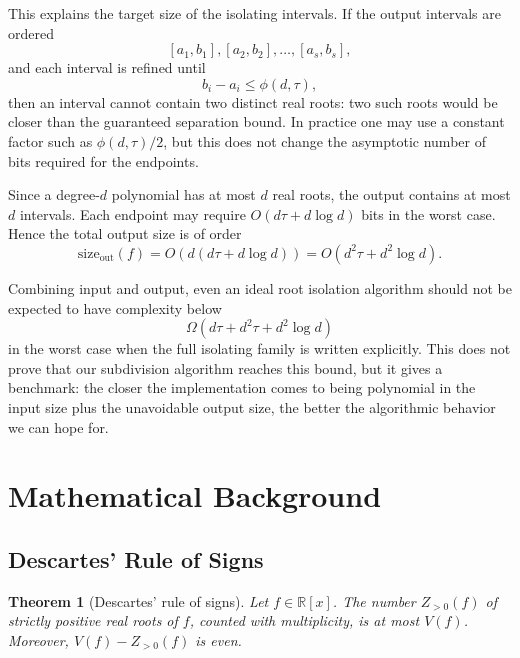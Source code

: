 \documentclass[letterpaper]{article}
\newtheorem{theorem}{Theorem}
\newcommand{\RR}{\mathbb{R}}
\newcommand{\size}{\mathrm{size}}
\begin{document}
This explains the target size of the isolating intervals. If the output
intervals are ordered
\[
  [a_1,b_1], [a_2,b_2], \ldots, [a_s,b_s],
\]
and each interval is refined until
\[
  b_i-a_i \leq \phi(d,\tau),
\]
then an interval cannot contain two distinct real roots: two such roots would
be closer than the guaranteed separation bound. In practice one may use a
constant factor such as $\phi(d,\tau)/2$, but this does not change the
asymptotic number of bits required for the endpoints.

Since a degree-$d$ polynomial has at most $d$ real roots, the output contains
at most $d$ intervals. Each endpoint may require
$O(d\tau+d\log d)$ bits in the worst case. Hence the total output size is of
order
\[
  \size_{\mathrm{out}}(f)
  =O\!\left(d(d\tau+d\log d)\right)
  =O(d^2\tau+d^2\log d).
\]

Combining input and output, even an ideal root isolation algorithm should not
be expected to have complexity below
\[
  \Omega\!\left(d\tau+d^2\tau+d^2\log d\right)
\]
in the worst case when the full isolating family is written explicitly. This
does not prove that our subdivision algorithm reaches this bound, but it gives
a benchmark: the closer the implementation comes to being polynomial in the
input size plus the unavoidable output size, the better the algorithmic
behavior we can hope for.

\section{Mathematical Background}

\subsection{Descartes' Rule of Signs}

\begin{theorem}[Descartes' rule of signs]
Let $f \in \RR[x]$. The number $Z_{>0}(f)$ of strictly positive real roots of
$f$, counted with multiplicity, is at most $V(f)$. Moreover,
$V(f)-Z_{>0}(f)$ is even.
\end{theorem}
\end{document}
